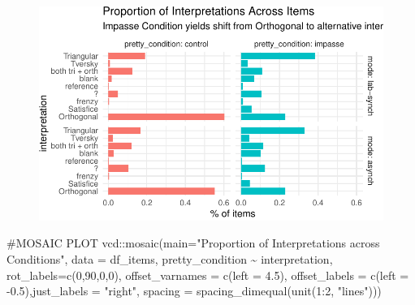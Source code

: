 \documentclass[
  letterpaper,
  DIV=11,
  numbers=noendperiod]{scrreprt}
\newenvironment{Shaded}{\begin{snugshade}}{\end{snugshade}}
\newcommand{\AttributeTok}[1]{\textcolor[rgb]{0.40,0.45,0.13}{#1}}
\newcommand{\CommentTok}[1]{\textcolor[rgb]{0.37,0.37,0.37}{#1}}
\newcommand{\DecValTok}[1]{\textcolor[rgb]{0.68,0.00,0.00}{#1}}
\newcommand{\FloatTok}[1]{\textcolor[rgb]{0.68,0.00,0.00}{#1}}
\newcommand{\FunctionTok}[1]{\textcolor[rgb]{0.28,0.35,0.67}{#1}}
\newcommand{\NormalTok}[1]{\textcolor[rgb]{0.00,0.23,0.31}{#1}}
\newcommand{\SpecialCharTok}[1]{\textcolor[rgb]{0.37,0.37,0.37}{#1}}
\newcommand{\StringTok}[1]{\textcolor[rgb]{0.13,0.47,0.30}{#1}}
\begin{document}
\begin{figure}[H]

{\centering \includegraphics{analysis/SGC3A/3_sgc3A_description_files/figure-pdf/VIS-ITEM-INTERPRETATION-1.pdf}

}

\end{figure}

\begin{Shaded}
\begin{Highlighting}[]
\CommentTok{\#MOSAIC PLOT}
\NormalTok{vcd}\SpecialCharTok{::}\FunctionTok{mosaic}\NormalTok{(}\AttributeTok{main=}\StringTok{"Proportion of Interpretations across Conditions"}\NormalTok{,}
            \AttributeTok{data =}\NormalTok{ df\_items, pretty\_condition }\SpecialCharTok{\textasciitilde{}}\NormalTok{ interpretation, }\AttributeTok{rot\_labels=}\FunctionTok{c}\NormalTok{(}\DecValTok{0}\NormalTok{,}\DecValTok{90}\NormalTok{,}\DecValTok{0}\NormalTok{,}\DecValTok{0}\NormalTok{), }
            \AttributeTok{offset\_varnames =} \FunctionTok{c}\NormalTok{(}\AttributeTok{left =} \FloatTok{4.5}\NormalTok{), }\AttributeTok{offset\_labels =} \FunctionTok{c}\NormalTok{(}\AttributeTok{left =} \SpecialCharTok{{-}}\FloatTok{0.5}\NormalTok{),}\AttributeTok{just\_labels =} \StringTok{"right"}\NormalTok{,}
            \AttributeTok{spacing =} \FunctionTok{spacing\_dimequal}\NormalTok{(}\FunctionTok{unit}\NormalTok{(}\DecValTok{1}\SpecialCharTok{:}\DecValTok{2}\NormalTok{, }\StringTok{"lines"}\NormalTok{))) }
\end{Highlighting}
\end{Shaded}
\end{document}
